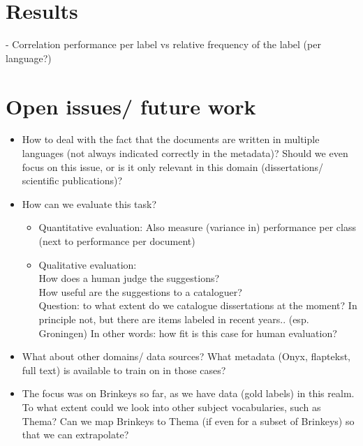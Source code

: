 \documentclass{article}
\begin{document}
\section{Results}

- Correlation performance per label vs relative frequency of the label (per language?)



\section{Open issues/ future work}

\begin{itemize}
    \item How to deal with the fact that the documents are written in multiple languages (not always indicated correctly in the metadata)? Should we even focus on this issue, or is it only relevant in this domain (dissertations/ scientific publications)?
    \item How can we evaluate this task?\begin{itemize}
        \item  Quantitative evaluation: Also measure (variance in) performance per class (next to performance per document)
  
        \item Qualitative evaluation:  \\
            How does a human judge the suggestions?\\
            How useful are the suggestions to a cataloguer?\\
            Question: to what extent do we catalogue dissertations at the moment? In principle not, but there are items labeled in recent years.. (esp. Groningen) In other words: how fit is this case for human evaluation?
    \end{itemize}            
    \item What about other domains/ data sources? What metadata (Onyx, flaptekst, full text) is available to train on in those cases?
    \item The focus was on Brinkeys so far, as we have data (gold labels) in this realm. To what extent could we look into other subject vocabularies, such as Thema? Can we map Brinkeys to Thema (if even for a subset of Brinkeys) so that we can extrapolate?
\end{itemize}
\end{document}
